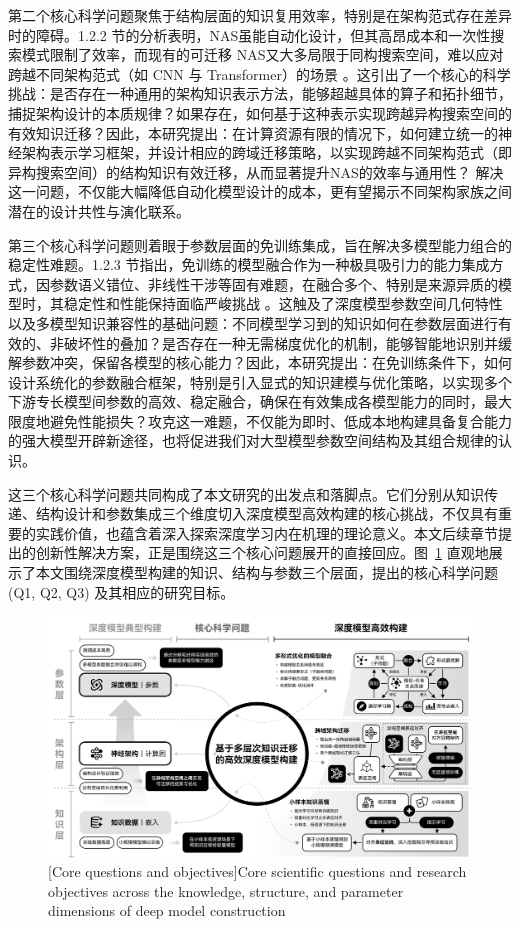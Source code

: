 \documentclass[../main.tex]{subfiles}
\begin{document}
第二个核心科学问题聚焦于结构层面的知识复用效率，特别是在架构范式存在差异时的障碍。1.2.2 节的分析表明，NAS虽能自动化设计，但其高昂成本和一次性搜索模式限制了效率，而现有的可迁移 NAS又大多局限于同构搜索空间，难以应对跨越不同架构范式（如 CNN 与 Transformer）的场景 。这引出了一个核心的科学挑战：是否存在一种通用的架构知识表示方法，能够超越具体的算子和拓扑细节，捕捉架构设计的本质规律？如果存在，如何基于这种表示实现跨越异构搜索空间的有效知识迁移？因此，本研究提出：在计算资源有限的情况下，如何建立统一的神经架构表示学习框架，并设计相应的跨域迁移策略，以实现跨越不同架构范式（即异构搜索空间）的结构知识有效迁移，从而显著提升NAS的效率与通用性？ 解决这一问题，不仅能大幅降低自动化模型设计的成本，更有望揭示不同架构家族之间潜在的设计共性与演化联系。

第三个核心科学问题则着眼于参数层面的免训练集成，旨在解决多模型能力组合的稳定性难题。1.2.3 节指出，免训练的模型融合作为一种极具吸引力的能力集成方式，因参数语义错位、非线性干涉等固有难题，在融合多个、特别是来源异质的模型时，其稳定性和性能保持面临严峻挑战 。这触及了深度模型参数空间几何特性以及多模型知识兼容性的基础问题：不同模型学习到的知识如何在参数层面进行有效的、非破坏性的叠加？是否存在一种无需梯度优化的机制，能够智能地识别并缓解参数冲突，保留各模型的核心能力？因此，本研究提出：在免训练条件下，如何设计系统化的参数融合框架，特别是引入显式的知识建模与优化策略，以实现多个下游专长模型间参数的高效、稳定融合，确保在有效集成各模型能力的同时，最大限度地避免性能损失？攻克这一难题，不仅能为即时、低成本地构建具备复合能力的强大模型开辟新途径，也将促进我们对大型模型参数空间结构及其组合规律的认识。

这三个核心科学问题共同构成了本文研究的出发点和落脚点。它们分别从知识传递、结构设计和参数集成三个维度切入深度模型高效构建的核心挑战，不仅具有重要的实践价值，也蕴含着深入探索深度学习内在机理的理论意义。本文后续章节提出的创新性解决方案，正是围绕这三个核心问题展开的直接回应。图~\ref{fig:research_questions} 直观地展示了本文围绕深度模型构建的知识、结构与参数三个层面，提出的核心科学问题 (Q1, Q2, Q3) 及其相应的研究目标。

\begin{figure}
	\centering
	\includegraphics[width=\linewidth]{research_question.pdf}
	[Core questions and objectives]{Core scientific questions and research objectives across the knowledge, structure, and parameter dimensions of deep model construction}\label{fig:research_questions}
\end{figure}
\end{document}

